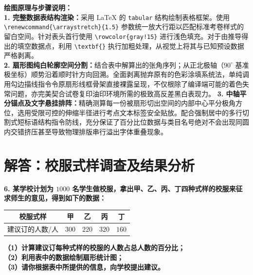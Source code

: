 \documentclass[12pt, a4paper]{ctexrep}
\begin{document}
\vspace{0.6cm}

{\small\color{blue!70!black}
\textbf{绘图原理与步骤说明：}\\
\textbf{1. 完整数据表结构渲染：}采用 LaTeX 的 \texttt{tabular} 结构绘制表格框架。使用 \texttt{\textbackslash renewcommand\{\textbackslash arraystretch\}\{1.5\}} 参数统一放大行距以匹配标准考卷样式的留白空间。针对表头首行使用 \texttt{\textbackslash rowcolor\{gray!15\}} 进行浅色填充。对于由推导得出的填空数据点，利用 \texttt{\textbackslash textbf\{\}} 执行加粗处理，从视觉上将其与已知预设数据严格剥离。\\
\textbf{2. 扇形图纯白轮廓空间分割：}结合表中解算出的张角序列；从正北极轴（$90^\circ$ 基准极坐标）顺势沿着顺时针方向回溯。全面剥离抛弃原有的色彩涂填系统法，单纯调用勾边描线指令令原扇形线框骨架直接裸露呈现，不仅根除了编译端可能的着色失常问题，亦完美契合试卷复印油印环境所需的极致高反差黑白表现力。
\textbf{3. 中轴平分锚点及文字悬挂排阵：}精确测算每一份被扇形切出空间的内部中心平分极角方位，选用受限可控的伸缩半径进行考点文本标签安全贴放。配合强制居中的多行切割式短标语结构指令防线，充分保证了百分比位数据与类目名号绝对不会出现同圆内交错挤压甚至导致物理排版串行溢出字体重叠现象。
}

\newpage

\section{解答：校服式样调查及结果分析}

\vspace{0.6cm}

\textbf{6. 某学校计划为 $1000$ 名学生做校服，拿出甲、乙、丙、丁四种式样的校服来征求师生的意见，得到如下的数据：}

\vspace{0.2cm}
\begin{center}
\renewcommand{\arraystretch}{1.5}
\begin{tabular}{|c|c|c|c|c|}
  \hline
  \rowcolor{gray!15} 
  校服式样 & 甲 & 乙 & 丙 & 丁 \\
  \hline
  建议订的人数/人 & $300$ & $220$ & $320$ & $160$ \\
  \hline
\end{tabular}
\end{center}
\vspace{0.2cm}

\textbf{（1）计算建议订每种式样的校服的人数占总人数的百分比；}\\
\textbf{（2）利用表中的数据绘制扇形统计图；}\\
\textbf{（3）请你根据表中所提供的信息，向学校提出建议。}
\end{document}
